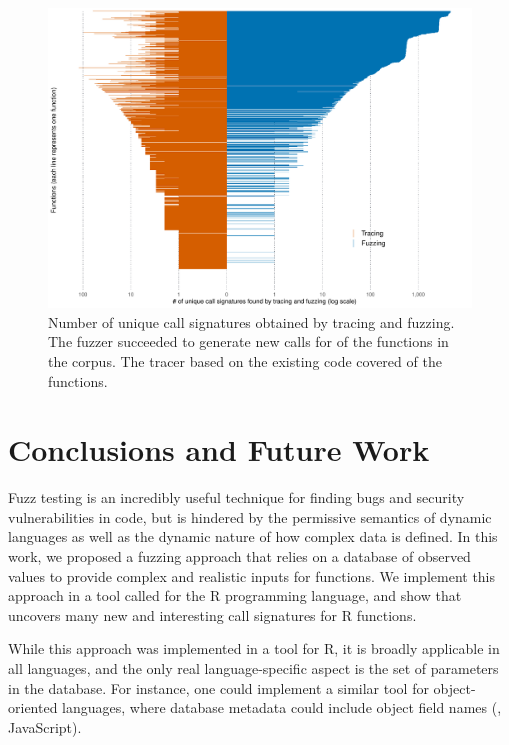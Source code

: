 \documentclass[sigplan,anonymous,review]{acmart}
\begin{document}
\begin{figure}
    \centering
    \includegraphics[width=\columnwidth]{code-and-figures/uf-call-signatures.pdf}
    \caption{Number of unique call signatures obtained by tracing and fuzzing. The fuzzer succeeded to generate new calls for \UFNumFunctionSignatrSignatureRatio of the functions in the corpus. The tracer based on the existing code covered \UFNumFunctionBaselineSignatureRatio of the functions.}
    \label{fig:call-signatures}
\end{figure}

\section{Conclusions and Future Work}
\label{sec:conclusions}

Fuzz testing is an incredibly useful technique for finding bugs and security vulnerabilities in code, but is hindered by the permissive semantics of dynamic languages as well as the dynamic nature of how complex data is defined.
In this work, we proposed a fuzzing approach that relies on a database of observed values to provide complex and realistic inputs for functions.
We implement this approach in a tool called \tool for the R programming language, and show that \tool uncovers many new and interesting call signatures for R functions.

While this approach was implemented in a tool for R, it is broadly applicable in all languages, and the only real language-specific aspect is the set of parameters in the database.
For instance, one could implement a similar tool for object-oriented languages, where database metadata could include object field names (\Eg, JavaScript).
\end{document}
